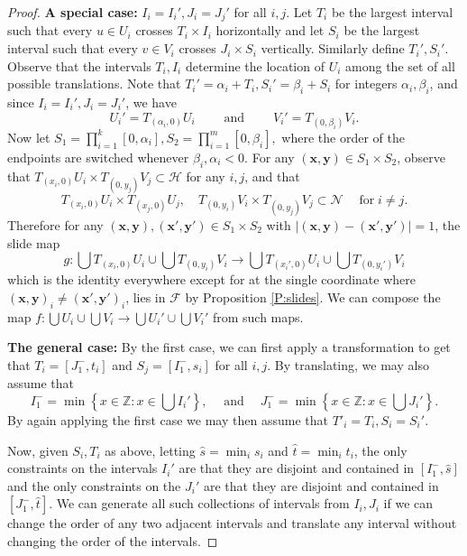 \documentclass[10pt,a4paper]{amsart}
\newcommand{\X}{\times}
\newcommand{\Z}{\mathds{Z}}
\newcommand{\al}{\alpha}
\newcommand{\be}{\beta}
\newcommand{\bx}{\mathbf{x}}
\newcommand{\by}{\mathbf{y}}
\newcommand{\lf}{\left}
\newcommand{\mathand}{\;\text{and}\;}
\newcommand{\mathfor}{\;\text{for}\;}
\newcommand{\rg}{\right}
\newcommand{\scrF}{\mathcal{F}}
\newcommand{\scrH}{\mathcal{H}}
\newcommand{\scrN}{\mathcal{N}}
\newcommand{\sset}{\subset}
\begin{document}
\begin{proof}
	\textbf{A special case:} $I_i = I_i', J_i = J_j'$ for all $i, j$. \qquad Let $T_i$ be the largest interval such that every $u \in U_i$ crosses $T_i \X I_i$ horizontally and let $S_i$ be the largest interval such that every $v \in V_i$ crosses $J_i \X S_i$ vertically. Similarly define $T_i', S_i'$. Observe that the intervals $T_i, I_i$ determine the location of $U_i$ among the set of all possible translations. Note that $T_i' = \al_i + T_i, S_i' = \be_i + S_i$ for integers $\al_i, \be_i$, and since $I_i = I_i', J_i = J_i'$, we have
	$$
	U_i' = T_{(\al_i, 0)} U_i \qquad \mathand \qquad  V_i' = T_{(0, \be_i)} V_i.
	$$
	Now let $S_1 = \prod_{i=1}^k [0, \al_i], S_2 =  \prod_{i=1}^m [0, \be_i],$ where the order of the endpoints are switched whenever $\be_i, \al_i < 0$.
	For any $(\bx, \by) \in S_1 \X S_2$, observe that $T_{(x_i, 0)} U_i \X T_{(0, y_j)} V_j \sset \scrH$ for any $i, j$, and that 
	$$
	T_{(x_i, 0)} U_i \X T_{(x_j, 0)} U_j, \quad T_{(0, y_i)} V_i \X T_{(0, y_j)} V_j \sset \scrN \quad \mathfor i \ne j.
	$$ 
	Therefore 
	for any $(\bx, \by), (\bx', \by') \in S_1 \X S_2$ with $|(\bx, \by) - (\bx', \by')| = 1$, the slide map
	$$
	g:\bigcup T_{(x_i, 0)} U_i \cup \bigcup T_{(0, y_i)} V_i \to \bigcup T_{(x_i', 0)} U_i \cup \bigcup T_{(0, y_i')} V_i
	$$
	which is the identity everywhere except for at the single coordinate where $(\bx, \by)_i \ne (\bx', \by')_i$, lies in $\scrF$ by Proposition \ref{P:slides}. We can compose the map $f:\bigcup U_i \cup \bigcup V_i \to \bigcup U_i' \cup \bigcup V_i'$ from such maps.
	
	\textbf{The general case:} \qquad By the first case, we can first apply a transformation to get that $T_i = [J_1^-, t_i]$ and $S_j = [I_1^-, s_i]$ for all $i, j$. By translating, we may also assume that 
	$$
	I_1^- = \min \lf\{x \in \Z: x \in \bigcup I_i' \rg\}, \quad \mathand \quad J_1^- = \min \lf\{x \in \Z: x \in \bigcup J_i' \rg\}.
	$$
	By again applying the first case we may then assume that $T'_i = T_i, S_i = S_i'$.
	
	Now, given $S_i, T_i$ as above, letting $\hat s = \min_i s_i$ and $\hat t = \min_i t_i$, the only constraints on the intervals $I_i'$ are that they are disjoint and contained in $[I_1^-, \hat s]$ and the only constraints on the $J_i'$ are that they are disjoint and contained in $[J_1^-, \hat t]$. We can generate all such collections of intervals from $I_i, J_i$ if we can change the order of any two adjacent intervals and translate any interval without changing the order of the intervals. 
	

\end{proof}
\end{document}

